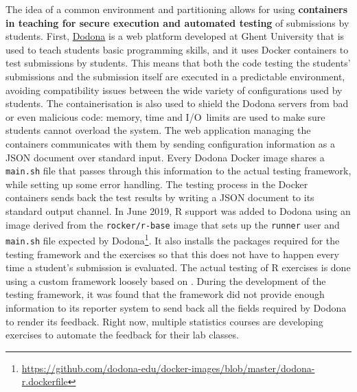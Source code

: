 The idea of a common environment and partitioning allows for using
\textbf{containers in teaching for secure execution and automated
testing} of submissions by students. First,
\href{https://dodona.ugent.be}{Dodona} is a web platform developed at
Ghent University that is used to teach students basic programming
skills, and it uses Docker containers to test submissions by students.
This means that both the code testing the students' submissions and the
submission itself are executed in a predictable environment, avoiding
compatibility issues between the wide variety of configurations used by
students. The containerisation is also used to shield the Dodona servers
from bad or even malicious code: memory, time and I/O~limits are used to
make sure students cannot overload the system. The web application
managing the containers communicates with them by sending configuration
information as a JSON document over standard input. Every Dodona Docker
image shares a \texttt{main.sh} file that passes through this
information to the actual testing framework, while setting up some error
handling. The testing process in the Docker containers sends back the
test results by writing a JSON document to its standard output channel.
In June 2019, R support was added to Dodona using an image derived from
the \texttt{rocker/r-base} image that sets up the \texttt{runner} user
and \texttt{main.sh} file expected by
Dodona\footnote{\href{https://github.com/dodona-edu/docker-images/blob/master/dodona-r.dockerfile}{https://github.com/dodona-edu/docker-images/blob/master/dodona-r.dockerfile}}.
It also installs the packages required for the testing framework and the
exercises so that this does not have to happen every time a student's
submission is evaluated. The actual testing of R exercises is done using
a custom framework loosely based on 
\citep{wickham_testthat_2011}. During the development of the testing
framework, it was found that the  framework did not
provide enough information to its reporter system to send back all the
fields required by Dodona to render its feedback. Right now, multiple
statistics courses are developing exercises to automate the feedback for
their lab classes.

